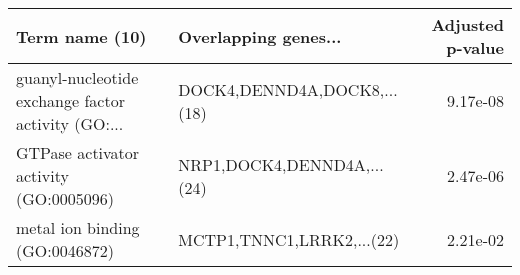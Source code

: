 \begin{tabular}{llr}
\toprule
                                    Term name (10) &        Overlapping genes... &  Adjusted p-value \\
\midrule
guanyl-nucleotide exchange factor activity (GO:... & DOCK4,DENND4A,DOCK8,...(18) &          9.17e-08 \\
            GTPase activator activity (GO:0005096) &  NRP1,DOCK4,DENND4A,...(24) &          2.47e-06 \\
                    metal ion binding (GO:0046872) &   MCTP1,TNNC1,LRRK2,...(22) &          2.21e-02 \\
\bottomrule
\end{tabular}
